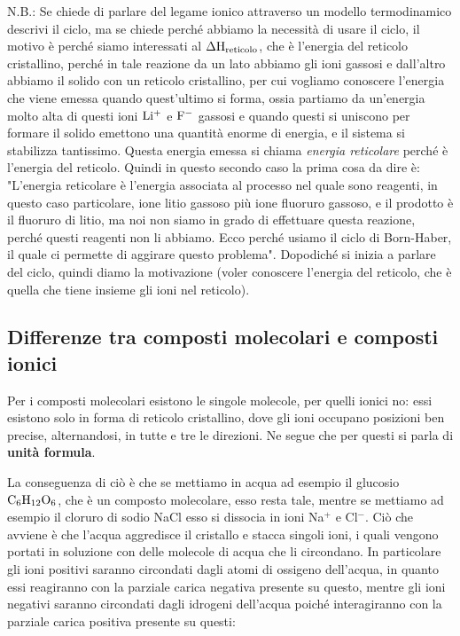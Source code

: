 \vspace{0.2cm}N.B.: Se chiede di parlare del legame ionico attraverso un modello termodinamico descrivi il ciclo, ma se chiede perché abbiamo la necessità di usare il ciclo, il motivo è perché siamo interessati al $\Delta\rm{H}_{reticolo}$, che è l'energia del reticolo cristallino, perché in tale reazione da un lato abbiamo gli ioni gassosi e dall'altro abbiamo il solido con un reticolo cristallino, per cui vogliamo conoscere l'energia che viene emessa quando quest'ultimo si forma, ossia partiamo da un'energia molto alta di questi ioni $\rm Li^+$ e $\rm F^-$ gassosi e quando questi si uniscono per formare il solido emettono una quantità enorme di energia, e il sistema si stabilizza tantissimo. Questa energia emessa si chiama \textit{energia reticolare} perché è l'energia del reticolo. Quindi in questo secondo caso la prima cosa da dire è: "L'energia reticolare è l'energia associata al processo nel quale sono reagenti, in questo caso particolare, ione litio gassoso più ione fluoruro gassoso, e il prodotto è il fluoruro di litio, ma noi non siamo in grado di effettuare questa reazione, perché questi reagenti non li abbiamo. Ecco perché usiamo il ciclo di Born-Haber, il quale ci permette di aggirare questo problema". Dopodiché si inizia a parlare del ciclo, quindi diamo la motivazione (voler conoscere l'energia del reticolo, che è quella che tiene insieme gli ioni nel reticolo).

\subsection{Differenze tra composti molecolari e composti ionici}
Per i composti molecolari esistono le singole molecole, per quelli ionici no: essi esistono solo in forma di reticolo cristallino, dove gli ioni occupano posizioni ben precise, alternandosi, in tutte e tre le direzioni. Ne segue che per questi si parla di \textbf{unità formula}.

La conseguenza di ciò è che se mettiamo in acqua ad esempio il glucosio $\rm C_6H_{12}O_6$, che è un composto molecolare, esso resta tale, mentre se mettiamo ad esempio il cloruro di sodio NaCl esso si dissocia in ioni Na$^+$ e Cl$^-$. Ciò che avviene è che l'acqua aggredisce il cristallo e stacca singoli ioni, i quali vengono portati in soluzione con delle molecole di acqua che li circondano. In particolare gli ioni positivi saranno circondati dagli atomi di ossigeno dell'acqua, in quanto essi reagiranno con la parziale carica negativa presente su questo, mentre gli ioni negativi saranno circondati dagli idrogeni dell'acqua poiché interagiranno con la parziale carica positiva presente su questi:

